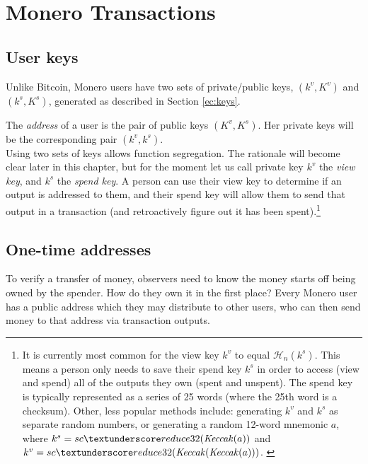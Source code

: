 \chapter{Monero Transactions}
\label{chapter:transactions}

\section{User keys}
\label{sec:user-keys}

Unlike Bitcoin, Monero users have two sets of private/public keys, \((k^v, K^v)\) and \( (k^s, K^s) \), generated as described in Section \ref{ec:keys}.

The {\em address} of a user is the pair of public keys \((K^v, K^s)\). Her private keys will be the corresponding pair \( (k^v, k^s) \).
\\

Using two sets of keys allows function segregation. The rationale will become clear later in this chapter, but for the moment let us call private key $k^v$ the {\em view key}, and $k^s$ the {\em spend key}. A person can use their view key to determine if an output is addressed to them, and their spend key will allow them to send that output in a transaction (and retroactively figure out it has been spent).\footnote{It is currently most common for the view key $k^v$ to equal $\mathcal{H}_n(k^s)$. This means a person only needs to save their spend key $k^s$ in order to access (view and spend) all of the outputs they own (spent and unspent). The spend key is typically represented as a series of 25 words (where the 25th word is a checksum). Other, less popular methods include: generating $k^v$ and $k^s$ as separate random numbers, or generating a random 12-word mnemonic $a$, where $k^s = sc\textunderscore reduce32(\mathit{Keccak}(a))$ and $k^v = sc\textunderscore reduce32(\mathit{Keccak}(\mathit{Keccak}(a)))$. \cite{luigi-address}}



\section{One-time addresses}
\label{sec:one-time-addresses}

To verify a transfer of money, observers need to know the money starts off being owned by the spender. How do they own it in the first place? Every Monero user has a public address which they may distribute to other users, who can then send money to that address via transaction outputs.

